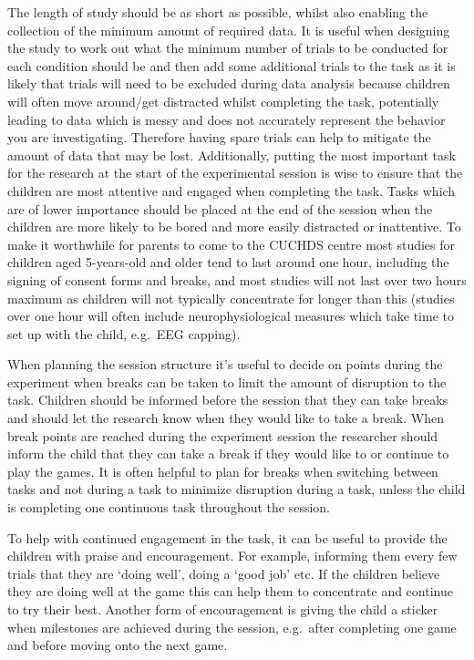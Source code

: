 \documentclass[
  12pt,
]{book}
\begin{document}
The length of study should be as short as possible, whilst also enabling the collection of the minimum amount of required data. It is useful when designing the study to work out what the minimum number of trials to be conducted for each condition should be and then add some additional trials to the task as it is likely that trials will need to be excluded during data analysis because children will often move around/get distracted whilst completing the task, potentially leading to data which is messy and does not accurately represent the behavior you are investigating. Therefore having spare trials can help to mitigate the amount of data that may be lost. Additionally, putting the most important task for the research at the start of the experimental session is wise to ensure that the children are most attentive and engaged when completing the task. Tasks which are of lower importance should be placed at the end of the session when the children are more likely to be bored and more easily distracted or inattentive. To make it worthwhile for parents to come to the CUCHDS centre most studies for children aged 5-years-old and older tend to last around one hour, including the signing of consent forms and breaks, and most studies will not last over two hours maximum as children will not typically concentrate for longer than this (studies over one hour will often include neurophysiological measures which take time to set up with the child, e.g.~EEG capping).

When planning the session structure it's useful to decide on points during the experiment when breaks can be taken to limit the amount of disruption to the task. Children should be informed before the session that they can take breaks and should let the research know when they would like to take a break. When break points are reached during the experiment session the researcher should inform the child that they can take a break if they would like to or continue to play the games. It is often helpful to plan for breaks when switching between tasks and not during a task to minimize disruption during a task, unless the child is completing one continuous task throughout the session.

To help with continued engagement in the task, it can be useful to provide the children with praise and encouragement. For example, informing them every few trials that they are `doing well', doing a `good job' etc. If the children believe they are doing well at the game this can help them to concentrate and continue to try their best. Another form of encouragement is giving the child a sticker when milestones are achieved during the session, e.g.~after completing one game and before moving onto the next game.
\end{document}

